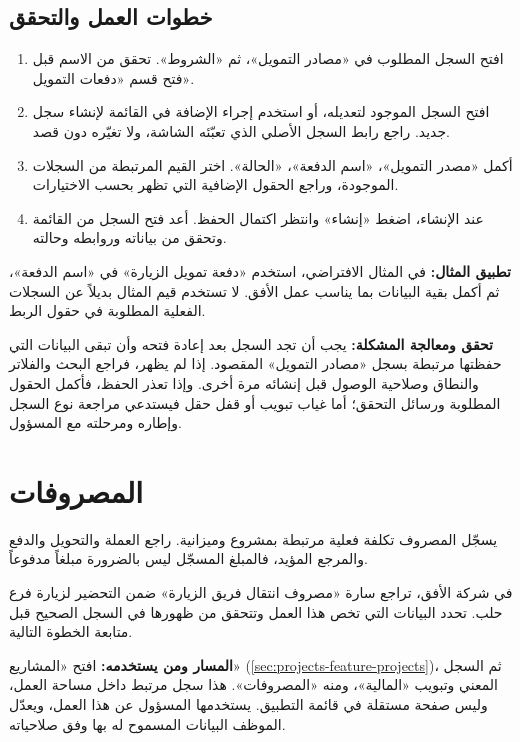 \subsection{خطوات العمل والتحقق}
\begin{enumerate}
\item افتح السجل المطلوب في «مصادر التمويل»، ثم «الشروط». تحقق من الاسم قبل فتح قسم «دفعات التمويل».
\item افتح السجل الموجود لتعديله، أو استخدم إجراء الإضافة في القائمة لإنشاء سجل جديد. راجع رابط السجل الأصلي الذي تعبّئه الشاشة، ولا تغيّره دون قصد.
\item أكمل «مصدر التمويل»، «اسم الدفعة»، «الحالة». اختر القيم المرتبطة من السجلات الموجودة، وراجع الحقول الإضافية التي تظهر بحسب الاختيارات.
\item عند الإنشاء، اضغط «إنشاء» وانتظر اكتمال الحفظ. أعد فتح السجل من القائمة وتحقق من بياناته وروابطه وحالته.
\end{enumerate}

\textbf{تطبيق المثال:} في المثال الافتراضي، استخدم «دفعة تمويل الزيارة» في «اسم الدفعة»، ثم أكمل بقية البيانات بما يناسب عمل الأفق. لا تستخدم قيم المثال بديلاً عن السجلات الفعلية المطلوبة في حقول الربط.

\textbf{تحقق ومعالجة المشكلة:} يجب أن تجد السجل بعد إعادة فتحه وأن تبقى البيانات التي حفظتها مرتبطة بسجل «مصادر التمويل» المقصود. إذا لم يظهر، فراجع البحث والفلاتر والنطاق وصلاحية الوصول قبل إنشائه مرة أخرى. وإذا تعذر الحفظ، فأكمل الحقول المطلوبة ورسائل التحقق؛ أما غياب تبويب أو قفل حقل فيستدعي مراجعة نوع السجل وإطاره ومرحلته مع المسؤول.

\clearpage
\section{المصروفات}
\label{sec:projects-feature-expenditures}

يسجّل المصروف تكلفة فعلية مرتبطة بمشروع وميزانية. راجع العملة والتحويل والدفع والمرجع المؤيد، فالمبلغ المسجّل ليس بالضرورة مبلغاً مدفوعاً.

\begin{rcnote}
في شركة الأفق، تراجع سارة «مصروف انتقال فريق الزيارة» ضمن التحضير لزيارة فرع حلب. تحدد البيانات التي تخص هذا العمل وتتحقق من ظهورها في السجل الصحيح قبل متابعة الخطوة التالية.
\end{rcnote}

\textbf{المسار ومن يستخدمه:} افتح «المشاريع» (\ref{sec:projects-feature-projects})، ثم السجل المعني وتبويب «المالية»، ومنه «المصروفات». هذا سجل مرتبط داخل مساحة العمل، وليس صفحة مستقلة في قائمة التطبيق. يستخدمها المسؤول عن هذا العمل، ويعدّل الموظف البيانات المسموح له بها وفق صلاحياته.


